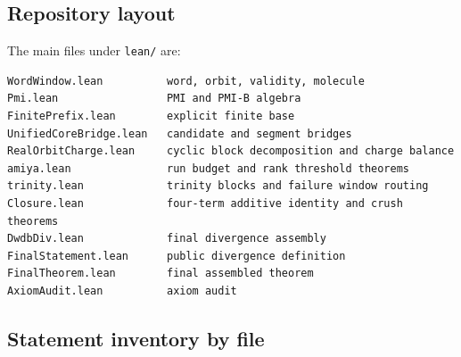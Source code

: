 \subsection{Repository layout}

The main files under \texttt{lean/} are:
\begin{verbatim}
WordWindow.lean          word, orbit, validity, molecule
Pmi.lean                 PMI and PMI-B algebra
FinitePrefix.lean        explicit finite base
UnifiedCoreBridge.lean   candidate and segment bridges
RealOrbitCharge.lean     cyclic block decomposition and charge balance
amiya.lean               run budget and rank threshold theorems
trinity.lean             trinity blocks and failure window routing
Closure.lean             four-term additive identity and crush theorems
DwdbDiv.lean             final divergence assembly
FinalStatement.lean      public divergence definition
FinalTheorem.lean        final assembled theorem
AxiomAudit.lean          axiom audit
\end{verbatim}

\subsection{Statement inventory by file}

